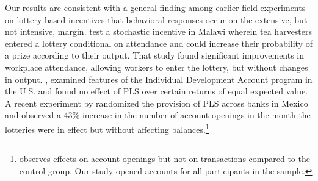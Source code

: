 \documentclass[11pt]{article}
\begin{document}




		Our results are consistent with a general finding among earlier field experiments on lottery-based incentives that behavioral responses occur on the extensive, but not intensive, margin. \textcite{brune_effect_2015} test a stochastic incentive in Malawi wherein tea harvesters entered a lottery conditional on attendance and could increase their probability of a prize according to their output. That study found significant improvements in workplace attendance, allowing workers to enter the lottery, but without changes in output. \textcite{loibl_testing_2016}, examined features of the Individual Development Account program in the U.S. and found no effect of PLS over certain returns of equal expected value. A recent experiment by \textcite{gertler_long-term_2017} randomized the provision of PLS across banks in Mexico and observed a 43\% increase in the number of account openings in the month the lotteries were in effect but without affecting balances.\footnote{\textcite{gertler_long-term_2017} observes effects on account openings but not on transactions compared to the control group. Our study opened accounts for all participants in the sample.}
\end{document}
